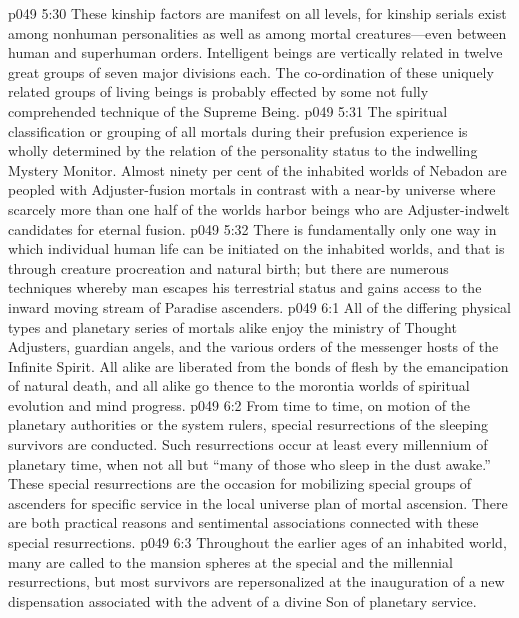 \vs p049 5:30 These kinship factors are manifest on all levels, for kinship serials exist among nonhuman personalities as well as among mortal creatures---even between human and superhuman orders. Intelligent beings are vertically related in twelve great groups of seven major divisions each. The co\hyp{}ordination of these uniquely related groups of living beings is probably effected by some not fully comprehended technique of the Supreme Being.
\pc \vs p049 5:31 \bibnobreakspace {} The spiritual classification or grouping of all mortals during their prefusion experience is wholly determined by the relation of the personality status to the indwelling Mystery Monitor. Almost ninety per cent of the inhabited worlds of Nebadon are peopled with Adjuster\hyp{}fusion mortals in contrast with a near\hyp{}by universe where scarcely more than one half of the worlds harbor beings who are Adjuster\hyp{}indwelt candidates for eternal fusion.
\pc \vs p049 5:32 \bibnobreakspace {} There is fundamentally only one way in which individual human life can be initiated on the inhabited worlds, and that is through creature procreation and natural birth; but there are numerous techniques whereby man escapes his terrestrial status and gains access to the inward moving stream of Paradise ascenders.
\vs p049 6:1 All of the differing physical types and planetary series of mortals alike enjoy the ministry of Thought Adjusters, guardian angels, and the various orders of the messenger hosts of the Infinite Spirit. All alike are liberated from the bonds of flesh by the emancipation of natural death, and all alike go thence to the morontia worlds of spiritual evolution and mind progress.
\vs p049 6:2 From time to time, on motion of the planetary authorities or the system rulers, special resurrections of the sleeping survivors are conducted. Such resurrections occur at least every millennium of planetary time, when not all but “many of those who sleep in the dust awake.” These special resurrections are the occasion for mobilizing special groups of ascenders for specific service in the local universe plan of mortal ascension. There are both practical reasons and sentimental associations connected with these special resurrections.
\vs p049 6:3 Throughout the earlier ages of an inhabited world, many are called to the mansion spheres at the special and the millennial resurrections, but most survivors are repersonalized at the inauguration of a new dispensation associated with the advent of a divine Son of planetary service.
